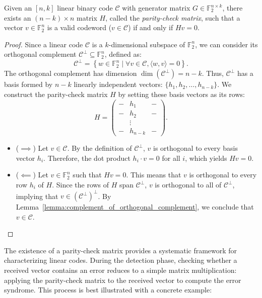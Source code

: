 \begin{theorem}\label{thm:parity_check_matrix}
Given an $[n, k]$ linear binary code $\mathcal{C}$ with generator matrix $G \in \mathbb{F}_2^{n \times k}$, there exists an $(n - k) \times n$ matrix $H$, called the \textit{parity-check matrix}, such that a vector $v \in \mathbb{F}^n_2$ is a valid codeword ($v \in \mathcal{C}$) if and only if $H v = 0$.
\begin{proof}
Since a linear code $\mathcal{C}$ is a $k$-dimensional subspace of $\mathbb{F}^n_2$, we can consider its orthogonal complement $\mathcal{C}^\perp \subseteq \mathbb{F}^n_2$, defined as:
\begin{equation}
\mathcal{C}^\perp = \left\{w \in \mathbb{F}^n_2 \mid \forall v \in \mathcal{C}, \langle w, v \rangle = 0\right\}
.\end{equation}
The orthogonal complement has dimension $\dim(\mathcal{C}^\perp) = n - k$. Thus, $\mathcal{C}^\perp$ has a basis formed by $n - k$ linearly independent vectors: $\{h_1, h_2, \ldots, h_{n - k}\}$. We construct the parity-check matrix $H$ by setting these basis vectors as its rows:
\begin{equation}
H = \begin{pmatrix} - & h_1 & - \\ - & h_2 & - \\ & \vdots & \\ - & h_{n - k} & - \end{pmatrix}
.\end{equation}

\begin{itemize}
\item ($\implies$) Let $v \in \mathcal{C}$. By the definition of $\mathcal{C}^\perp$, $v$ is orthogonal to every basis vector $h_i$. Therefore, the dot product $h_i \cdot v = 0$ for all $i$, which yields $H v = 0$.
\item ($\impliedby$) Let $v \in \mathbb{F}^n_2$ such that $H v = 0$. This means that $v$ is orthogonal to every row $h_i$ of $H$. Since the rows of $H$ span $\mathcal{C}^\perp$, $v$ is orthogonal to all of $\mathcal{C}^\perp$, implying that $v \in (\mathcal{C}^\perp)^\perp$. By Lemma~\ref{lemma:complement_of_orthogonal_complement}, we conclude that $v \in \mathcal{C}$.
\end{itemize}
\end{proof}
\end{theorem}

The existence of a parity-check matrix provides a systematic framework for characterizing linear codes. During the detection phase, checking whether a received vector contains an error reduces to a simple matrix multiplication: applying the parity-check matrix to the received vector to compute the error syndrome. This process is best illustrated with a concrete example:

